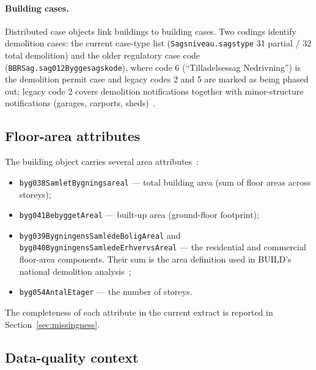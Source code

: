 \paragraph{Building cases.}
Distributed case objects link buildings to building cases. Two codings
identify demolition cases: the current case-type list
(\texttt{Sagsniveau.sagstype} 31 partial / 32 total demolition) and the
older regulatory case code (\texttt{BBRSag.sag012Byggesagskode}), where
code 6 (``Tilladelsessag Nedrivning'') is the demolition permit case and
legacy codes 2 and 5 are marked as being phased out; legacy code 2
covers demolition notifications together with minor-structure
notifications (garages, carports, sheds)~\cite{bbr_kodelister}.

\subsection{Floor-area attributes}\label{sec:bbr-areas}

The building object carries several area
attributes~\cite{datafordeler_grunddatamodel}:

\begin{itemize}
  \item \texttt{byg038SamletBygningsareal} --- total building area (sum
        of floor areas across storeys);
  \item \texttt{byg041BebyggetAreal} --- built-up area (ground-floor
        footprint);
  \item \texttt{byg039BygningensSamledeBoligAreal} and
        \texttt{byg040BygningensSamledeErhvervsAreal} --- the
        residential and commercial floor-area components. Their sum is
        the area definition used in BUILD's national demolition
        analysis~\cite{jensen2025nedrivning};
  \item \texttt{byg054AntalEtager} --- the number of storeys.
\end{itemize}

The completeness of each attribute in the current extract is reported in
Section~\ref{sec:missingness}. 

\subsection{Data-quality context}\label{sec:bbr-quality}

